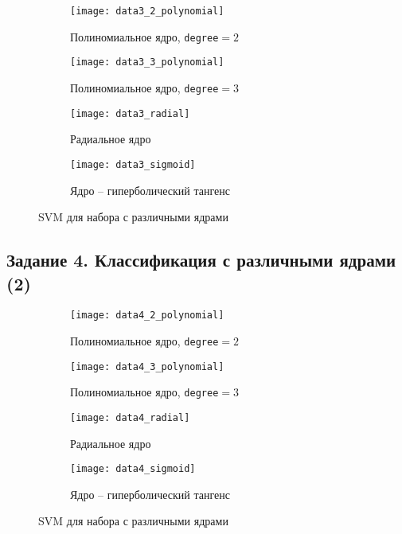 \documentclass[a4paper,12pt]{article} %
\newcommand{\myPictWidth}{.95\textwidth}
\begin{document}
\begin{figure}[H]
    \centering
    \begin{subfigure}{.5\textwidth}
        \centering
        \texttt{[image: data3\_2\_polynomial]}
        \caption{Полиномиальное ядро, \texttt{degree}$ =2 $}
        \label{fig:data3_2_polynomial}
    \end{subfigure}%
    \begin{subfigure}{.5\textwidth}
        \centering
        \texttt{[image: data3\_3\_polynomial]}
        \caption{Полиномиальное ядро, \texttt{degree}$ =3 $}
        \label{fig:data3_3_polynomial}
    \end{subfigure}

    \begin{subfigure}{.5\textwidth}
        \centering
        \texttt{[image: data3\_radial]}
        \caption{Радиальное ядро}
        \label{fig:data3_radial}
    \end{subfigure}%
    \begin{subfigure}{.5\textwidth}
        \centering
        \texttt{[image: data3\_sigmoid]}
        \caption{Ядро -- гиперболический тангенс}
        \label{fig:data3_sigmoid}
    \end{subfigure}
    \caption{SVM для набора  с различными ядрами}
    \label{fig:3}
\end{figure}

\subsection{Задание 4. Классификация с различными ядрами (2)}

\begin{figure}[H]
    \centering
    \begin{subfigure}{.5\textwidth}
        \centering
        \texttt{[image: data4\_2\_polynomial]}
        \caption{Полиномиальное ядро, \texttt{degree}$ =2 $}
        \label{fig:data4_2_polynomial}
    \end{subfigure}%
    \begin{subfigure}{.5\textwidth}
        \centering
        \texttt{[image: data4\_3\_polynomial]}
        \caption{Полиномиальное ядро, \texttt{degree}$ =3 $}
        \label{fig:data4_3_polynomial}
    \end{subfigure}

    \begin{subfigure}{.5\textwidth}
        \centering
        \texttt{[image: data4\_radial]}
        \caption{Радиальное ядро}
        \label{fig:data4_radial}
    \end{subfigure}%
    \begin{subfigure}{.5\textwidth}
        \centering
        \texttt{[image: data4\_sigmoid]}
        \caption{Ядро -- гиперболический тангенс}
        \label{fig:data4_sigmoid}
    \end{subfigure}
    \caption{SVM для набора  с различными ядрами}
    \label{fig:4}
\end{figure}
\end{document}

